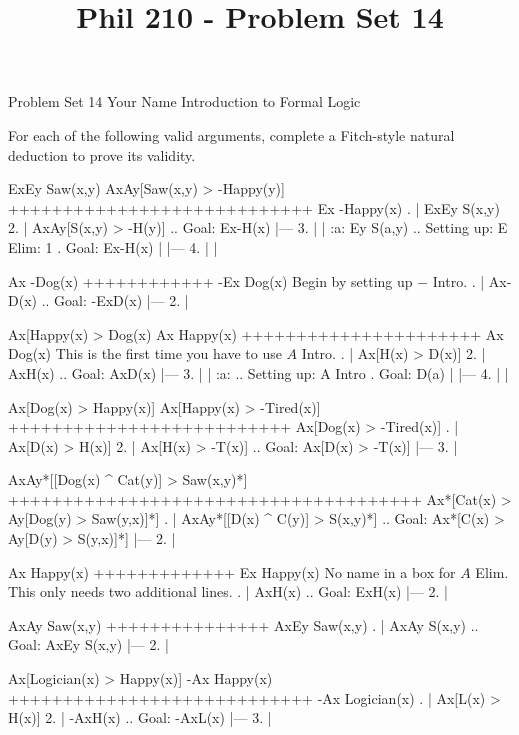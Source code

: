 
\title{Phil 210 - Problem Set 14}

\heading
Problem Set 14
Your Name
Introduction to Formal Logic
\endheading

For each of the following valid arguments, complete a Fitch-style natural deduction to prove its validity.

\quantifiers
\problems
{}
\argument
 ExEy Saw(x,y)
 AxAy[Saw(x,y) > -Happy(y)]
++++++++++++++++++++++++++++
 Ex -Happy(x)
\endargument
        \answer
        . | ExEy S(x,y)
         2. | AxAy[S(x,y) > -H(y)]  ..  Goal: Ex-H(x)
            |---
         3. |   | :a: Ey S(a,y)     ..  Setting up: E Elim: 1  .  Goal: Ex-H(x)
            |   |---
         4. |   |
        \endfitchproof
        \endanswer

\argument
 Ax -Dog(x)
++++++++++++
 -Ex Dog(x)
\endargument
\Hint Begin by setting up $-$ Intro.
        \answer
        . | Ax-D(x)  ..  Goal: -ExD(x)
            |---
         2. | 
        \endfitchproof
        \endanswer

\argument
 Ax[Happy(x) > Dog(x)
 Ax Happy(x)
++++++++++++++++++++++
 Ax Dog(x)
\endargument
\Hint This is the first time you have to use $A$ Intro.
        \answer
        . | Ax[H(x) > D(x)]
         2. | AxH(x)           ..  Goal: AxD(x)
            |---
         3. |   | :a:          ..  Setting up: A Intro  .  Goal: D(a)
            |   |---
         4. |   |
        \endfitchproof
        \endanswer

\argument
 Ax[Dog(x) > Happy(x)]
 Ax[Happy(x) > -Tired(x)]
++++++++++++++++++++++++++
 Ax[Dog(x) > -Tired(x)]
\endargument
        \answer
        . | Ax[D(x) > H(x)]
         2. | Ax[H(x) > -T(x)]  ..  Goal: Ax[D(x) > -T(x)]
            |---
         3. | 
        \endfitchproof
        \endanswer

\argument
 AxAy*[[Dog(x) ^ Cat(y)] > Saw(x,y)*]
++++++++++++++++++++++++++++++++++++++
 Ax*[Cat(x) > Ay[Dog(y) > Saw(y,x)]*]
\endargument
        \answer
        . | AxAy*[[D(x) ^ C(y)] > S(x,y)*]  ..  Goal: Ax*[C(x) > Ay[D(y) > S(y,x)]*]
            |---
         2. | 
        \endfitchproof
        \endanswer

\argument
 Ax Happy(x)
+++++++++++++
 Ex Happy(x)
\endargument
\Hint No name in a box for $A$ Elim. This only needs two additional lines.
        \answer
        . | AxH(x)  ..  Goal: ExH(x)
            |---
         2. | 
        \endfitchproof
        \endanswer

\argument
 AxAy Saw(x,y)
+++++++++++++++
 AxEy Saw(x,y)
\endargument
        \answer
        . | AxAy S(x,y)  ..  Goal: AxEy S(x,y)
            |---
         2. |
        \endfitchproof
        \endanswer

\argument
 Ax[Logician(x) > Happy(x)]
 -Ax Happy(x)
++++++++++++++++++++++++++++
 -Ax Logician(x)
\endargument
        \answer
        . | Ax[L(x) > H(x)]
         2. | -AxH(x)         ..  Goal: -AxL(x)
            |---
         3. |
        \endfitchproof
        \endanswer

\endproblems
\bye
